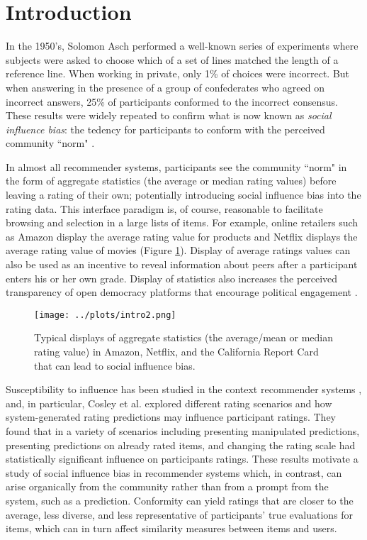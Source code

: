 \section{Introduction}

In the 1950's, Solomon Asch performed a well-known series of experiments 
\cite{asch1956studies, asch1955opinions, bond1996culture} where
subjects were asked to choose which of a set of lines matched the
length of a reference line.  
When working in private, only 1\% of choices were incorrect.  
But when answering in the presence of a group of confederates who agreed on incorrect answers, 25\% of participants
conformed to the incorrect consensus.  
These results were widely repeated to confirm what is now known as \emph{social influence bias}:
the tedency for participants to conform with the perceived community ``norm" \cite{demarzo2003persuasion,
moscovici1972social, wood2000attitude}.

In almost all recommender systems, participants see the community ``norm" in the form of 
aggregate statistics (the average or median rating values) before leaving a rating of their own;
potentially introducing social influence bias into the rating data.
This interface paradigm is, of course, reasonable to facilitate browsing and selection in a large lists of items.
For example, online retailers such as Amazon display the average rating value
for products and Netflix displays the average rating value of movies
(Figure \ref{grading-0}).  Display of average ratings values can also be
used as an incentive\cite{jian2012incentive} to reveal information about
peers after a participant enters his or her own grade.  
Display of statistics also increases the perceived transparency of open democracy platforms that encourage political engagement
\cite{albors2008new,o2012transparency,noveck2008wiki}.

\begin{figure}[t]
  \centering
    \texttt{[image: ../plots/intro2.png]}
      \caption{Typical displays of aggregate statistics (the average/mean or median rating value) in Amazon, Netflix, and the California Report Card
that can lead to social influence bias.}
      \label{grading-0}
\end{figure}

Susceptibility to influence has been studied in the context recommender systems \cite{cosley2003seeing}, and, in particular, Cosley et al. explored
different rating scenarios and how system-generated rating predictions may influence participant ratings.
They found that in a variety of scenarios including presenting manipulated predictions, presenting predictions on already rated items, and changing the rating scale had statistically significant influence on participants ratings.
These results motivate a study of social influence bias in recommender systems which, in contrast, can arise organically from the community rather than
from a prompt from the system, such as a prediction.
Conformity can yield ratings that are closer to the average, less diverse, and less representative of participants' true
evaluations for items, which can in turn affect similarity measures between items and users.  

